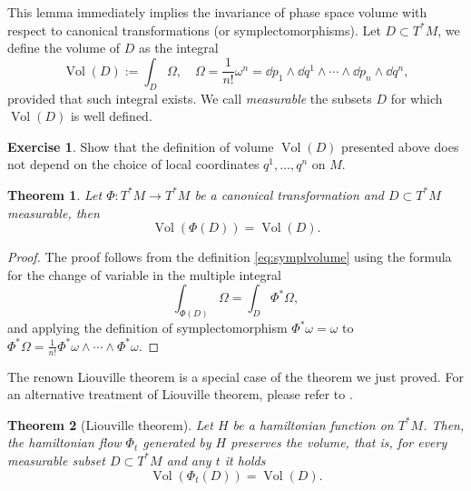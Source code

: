 \documentclass[english,fontsize=11pt,paper=b5]{scrbook}
\numberwithin{equation}{chapter}
\DeclareMathOperator{\Vol}{Vol}
\DeclareMathOperator{\Vol}{Vol}
\newtheorem{theorem}{Theorem}[chapter]
\theoremstyle{definition}
\newtheorem{exercise}{Exercise}[chapter]
\begin{document}
    This lemma immediately implies the invariance of phase space volume with respect to canonical transformations (or symplectomorphisms).
    Let $D\subset T^*M$, we define the volume of $D$ as the integral
    \begin{equation}\label{eq:symplvolume}
      \Vol(D) :=\int_D \Omega, \quad \Omega = \frac1{n!} \omega^n = \dd p_1 \wedge \dd q^1 \wedge \cdots \wedge \dd p_n \wedge \dd q^n,
    \end{equation}
    provided that such integral exists.
    We call \emph{measurable} the subsets $D$ for which $\Vol(D)$ is well defined.

    \begin{exercise}
      Show that the definition of volume $\Vol(D)$ presented above does not depend on the choice of local coordinates $q^1, \ldots, q^n$ on $M$.
    \end{exercise}

    \begin{theorem}\label{thm:liouville}
      Let $\Phi:T^*M \to T^*M$ be a canonical transformation and $D\subset T^*M$ measurable, then
      \begin{equation}
        \Vol(\Phi(D)) = \Vol(D).
      \end{equation}
    \end{theorem}
    \begin{proof}
      The proof follows from the definition \eqref{eq:symplvolume} using the formula for the change of variable in the multiple integral
      \begin{equation}
        \int_{\Phi(D)}\Omega = \int_D \Phi^*\Omega,
      \end{equation}
      and applying the definition of symplectomorphism $\Phi^* \omega = \omega$ to $\Phi^* \Omega = \frac1{n!}\Phi^*\omega\wedge\cdots\wedge\Phi^*\omega$.
    \end{proof}

    The renown Liouville theorem is a special case of the theorem we just proved.
    For an alternative treatment of Liouville theorem, please refer to \cite[Chapter 3.16]{book:arnold}.

    \begin{theorem}[Liouville theorem]
      Let $H$ be a hamiltonian function on $T^*M$.
      Then, the hamiltonian flow $\Phi_t$ generated by $H$ preserves the volume, that is, for every measurable subset $D\subset T^*M$ and any $t$ it holds
      \begin{equation}
        \Vol(\Phi_t(D)) = \Vol(D).
      \end{equation}
    \end{theorem}
\end{document}
